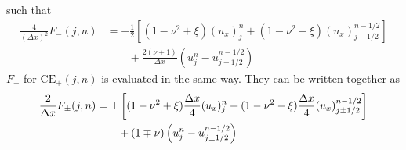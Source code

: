 \documentclass{turgon}
\begin{document}
such that
\begin{align*}
  \frac{4}{(\Delta x)^2}F_-(j,n) &=
    -\frac{1}{2}\left[
      (1-\nu^2+\xi)(u_x)_j^n + (1-\nu^2-\xi)(u_x)_{j-1/2}^{n-1/2}
    \right] \\
  &\quad\quad
  + \frac{2(\nu+1)}{\Delta x}\left(u_j^n-u_{j-1/2}^{n-1/2}\right)
\end{align*}
$F_+$ for $\mathrm{CE}_+(j,n)$ is evaluated in the same way.  They can be
written together as
\begin{align}
  \frac{2}{\Delta x}F_{\pm}(j,n) &=
    \pm\left[
        (1-\nu^2+\xi)\frac{\Delta x}{4}(u_x)_j^n
      + (1-\nu^2-\xi)\frac{\Delta x}{4}(u_x)_{j\pm1/2}^{n-1/2}
    \right] \notag \\
  &\quad\quad
  + (1\mp\nu)\left(u_j^n-u_{j\pm1/2}^{n-1/2}\right)
    \label{e:both_conserv_func}
\end{align}
\end{document}
